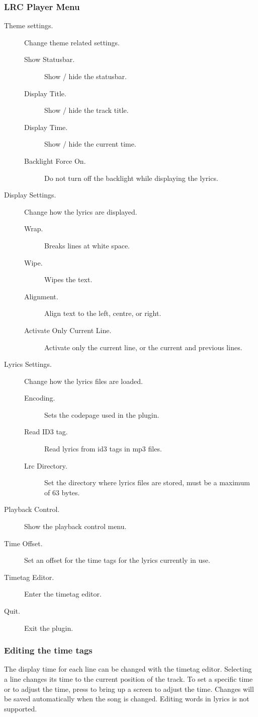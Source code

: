 \subsubsection{LRC Player Menu}

\begin{description}
  \item[Theme settings.] Change theme related settings.
  \begin{description}
    \item[Show Statusbar.] Show / hide the statusbar.
    \item[Display Title.] Show / hide the track title.
    \item[Display Time.] Show / hide the current time.
    \item[Backlight Force On.] Do not turn off the backlight while displaying
         the lyrics.
  \end{description}
  \item[Display Settings.] Change how the lyrics are displayed.
  \begin{description}
    \item[Wrap.] Breaks lines at white space.
    \item[Wipe.] Wipes the text.
    \item[Alignment.] Align text to the left, centre, or right.
    \item[Activate Only Current Line.]
        Activate only the current line, or the current and previous lines.
  \end{description}
  \item[Lyrics Settings.] Change how the lyrics files are loaded.
  \begin{description}
    \item[Encoding.] Sets the codepage used in the plugin.
    \item[Read ID3 tag.] Read lyrics from id3 tags in mp3 files.
    \item[Lrc Directory.] Set the directory where lyrics files are stored,
      must be a maximum of 63 bytes.
  \end{description}
  \item[Playback Control.] Show the playback control menu.
  \item[Time Offset.] Set an offset for the time tags for the lyrics currently in use.
  \item[Timetag Editor.] Enter the timetag editor.
  \item[Quit.] Exit the plugin.
\end{description}

\subsubsection{Editing the time tags}

The display time for each line can be changed with the timetag editor.
Selecting a line changes its time to the current position of the track.
To set a specific time or to adjust the time, press \ActionStdContext{} to
bring up a screen to adjust the time.
Changes will be saved automatically when the song is changed.
Editing words in lyrics is not supported.
